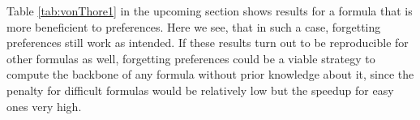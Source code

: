 Table \ref{tab:vonThore1} in the upcoming section shows results for a formula that is more beneficient to preferences. Here we see, that in such a case, forgetting preferences still work as intended. If these results turn out to be reproducible for other formulas as well, forgetting preferences could be a viable strategy to compute the backbone of any formula without prior knowledge about it, since the penalty for difficult formulas would be relatively low but the speedup for easy ones very high.


